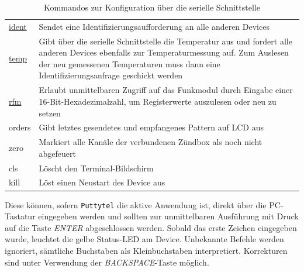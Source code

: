 \documentclass[pdftex, parskip, numbers=noenddot, toc=listof]{scrbook}
\begin{document}
\begin{table}[bt]
\begin{center}
\begin{tabularx}{.9\textwidth}{lX}
				\hyperref[sec:manuellessenden]{ident} & Sendet eine Identifizierungsaufforderung an alle anderen Devices                                                                                                                                                                    \\
				\hyperref[sec:manuellessenden]{temp}  & Gibt über die serielle Schnittstelle die Temperatur aus und fordert alle anderen Devices ebenfalls zur Temperaturmessung auf. Zum Auslesen der neu gemessenen Temperaturen muss dann eine Identifizierungsanfrage geschickt werden \\ \hline
				\hyperref[sec:rfmzugriff]{rfm}        & Erlaubt unmittelbaren Zugriff auf das Funkmodul durch Eingabe einer 16-Bit-Hexadezimalzahl, um Registerwerte auszulesen oder neu zu setzen                                                                                          \\ \hline
				orders                                & Gibt letztes gesendetes und empfangenes Pattern auf LCD aus                                                                                                                                                                         \\
				zero                                  & Markiert alle Kanäle der verbundenen Zündbox als noch nicht abgefeuert                                                                                                                                                            \\ \hline
				cls                                   & Löscht den Terminal-Bildschirm                                                                                                                                                                                                     \\
				kill                                  & Löst einen Neustart des Device aus                                                                                                                                                                                                 \\ \hline\hline
			\end{tabularx}
			\caption{Kommandos zur Konfiguration über die serielle Schnittstelle}
			\label{tab:commands}
		\end{center}
	\end{table}

	Diese können, sofern \texttt{Puttytel} die aktive Anwendung ist, direkt über die PC-Tastatur eingegeben werden und sollten zur unmittelbaren Ausführung mit Druck auf die Taste \emph{ENTER} abgeschlossen werden. Sobald das erste Zeichen eingegeben wurde, leuchtet die gelbe Status-LED am Device. Unbekannte Befehle werden ignoriert, sämtliche Buchstaben als Kleinbuchstaben interpretiert. Korrekturen sind unter Verwendung der \emph{BACKSPACE}-Taste möglich.
\end{document}
